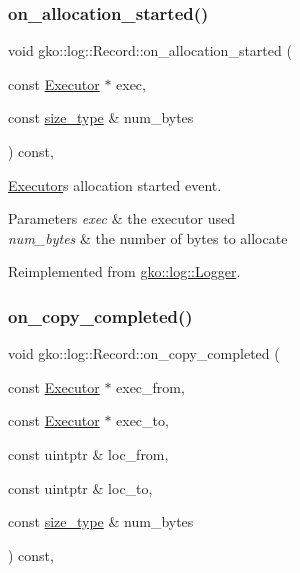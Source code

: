 \subsubsection{\texorpdfstring{on\+\_\+allocation\+\_\+started()}{on\_allocation\_started()}}
{\footnotesize\ttfamily void gko\+::log\+::\+Record\+::on\+\_\+allocation\+\_\+started (\begin{DoxyParamCaption}\item[{const \hyperlink{classgko_1_1Executor}{Executor} $\ast$}]{exec,  }\item[{const \hyperlink{namespacegko_a6e5c95df0ae4e47aab2f604a22d98ee7}{size\+\_\+type} \&}]{num\+\_\+bytes }\end{DoxyParamCaption}) const\hspace{0.3cm}{\ttfamily [override]}, {\ttfamily [virtual]}}



\hyperlink{classgko_1_1Executor}{Executor}\textquotesingle{}s allocation started event. 


\begin{DoxyParams}{Parameters}
{\em exec} & the executor used \\
\hline
{\em num\+\_\+bytes} & the number of bytes to allocate \\
\hline
\end{DoxyParams}


Reimplemented from \hyperlink{classgko_1_1log_1_1Logger}{gko\+::log\+::\+Logger}.

\mbox{\label{classgko_1_1log_1_1Record_a38e2969938c346ae1e7df52c79d30e07}} 
\subsubsection{\texorpdfstring{on\+\_\+copy\+\_\+completed()}{on\_copy\_completed()}}
{\footnotesize\ttfamily void gko\+::log\+::\+Record\+::on\+\_\+copy\+\_\+completed (\begin{DoxyParamCaption}\item[{const \hyperlink{classgko_1_1Executor}{Executor} $\ast$}]{exec\+\_\+from,  }\item[{const \hyperlink{classgko_1_1Executor}{Executor} $\ast$}]{exec\+\_\+to,  }\item[{const uintptr \&}]{loc\+\_\+from,  }\item[{const uintptr \&}]{loc\+\_\+to,  }\item[{const \hyperlink{namespacegko_a6e5c95df0ae4e47aab2f604a22d98ee7}{size\+\_\+type} \&}]{num\+\_\+bytes }\end{DoxyParamCaption}) const\hspace{0.3cm}{\ttfamily [override]}, {\ttfamily [virtual]}}



